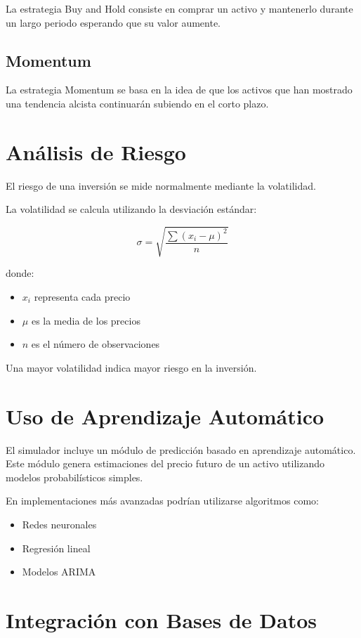 \documentclass[a4paper,12pt]{article}
\begin{document}
La estrategia Buy and Hold consiste en comprar un activo y mantenerlo durante un largo periodo esperando que su valor aumente.

\subsection{Momentum}

La estrategia Momentum se basa en la idea de que los activos que han mostrado una tendencia alcista continuarán subiendo en el corto plazo.

\section{Análisis de Riesgo}

El riesgo de una inversión se mide normalmente mediante la volatilidad.

La volatilidad se calcula utilizando la desviación estándar:

\[
\sigma = \sqrt{\frac{\sum (x_i - \mu)^2}{n}}
\]

donde:

\begin{itemize}
\item $x_i$ representa cada precio
\item $\mu$ es la media de los precios
\item $n$ es el número de observaciones
\end{itemize}

Una mayor volatilidad indica mayor riesgo en la inversión.

\section{Uso de Aprendizaje Automático}

El simulador incluye un módulo de predicción basado en aprendizaje automático. Este módulo genera estimaciones del precio futuro de un activo utilizando modelos probabilísticos simples.

En implementaciones más avanzadas podrían utilizarse algoritmos como:

\begin{itemize}
\item Redes neuronales
\item Regresión lineal
\item Modelos ARIMA
\end{itemize}

\section{Integración con Bases de Datos}
\end{document}
